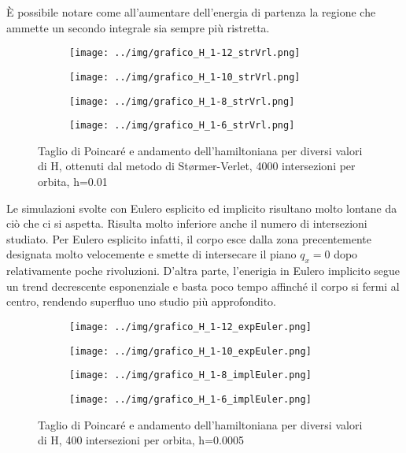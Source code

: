 \documentclass[a4paper, 12pt]{article}
\numberwithin{equation}{section}
\numberwithin{figure}{section}
\begin{document}
È possibile notare come all'aumentare dell'energia di partenza la regione che ammette un secondo
integrale sia sempre più ristretta.
\begin{figure}[h!]
	\centering
	\begin{subfigure}[t]{.49\textwidth}
		\centering
		\texttt{[image: ../img/grafico\_H\_1-12\_strVrl.png]}
	\end{subfigure}
	\begin{subfigure}[t]{.49\textwidth}
		\centering
		\texttt{[image: ../img/grafico\_H\_1-10\_strVrl.png]}
	\end{subfigure}
	\begin{subfigure}[t]{.49\textwidth}
		\centering
		\texttt{[image: ../img/grafico\_H\_1-8\_strVrl.png]}
	\end{subfigure}
	\begin{subfigure}[t]{.49\textwidth}
		\centering
		\texttt{[image: ../img/grafico\_H\_1-6\_strVrl.png]}
	\end{subfigure}

	\caption{Taglio di Poincaré e andamento dell'hamiltoniana per diversi valori di H,
	ottenuti dal metodo di Størmer-Verlet, 4000 intersezioni per orbita, h=0.01}
	\label{img:stormerverlet}
\end{figure}

Le simulazioni svolte con Eulero esplicito ed implicito risultano molto lontane da ciò che ci
si aspetta. Risulta molto inferiore anche il numero di intersezioni studiato.
Per Eulero esplicito infatti, il corpo esce dalla zona precentemente designata molto velocemente
e smette di intersecare il piano $q_x=0$ dopo relativamente poche rivoluzioni. D'altra parte,
l'enerigia in Eulero implicito segue un trend decrescente esponenziale e basta poco tempo affinché
il corpo si fermi al centro, rendendo superfluo uno studio più approfondito.
\clearpage
\begin{figure}[h!]
	\centering
	\begin{subfigure}[t]{.49\textwidth}
		\centering
		\texttt{[image: ../img/grafico\_H\_1-12\_expEuler.png]}
	\end{subfigure}
	\begin{subfigure}[t]{.49\textwidth}
		\centering
		\texttt{[image: ../img/grafico\_H\_1-10\_expEuler.png]}
	\end{subfigure}
	\begin{subfigure}[t]{.49\textwidth}
		\centering
		\texttt{[image: ../img/grafico\_H\_1-8\_implEuler.png]}
	\end{subfigure}
	\begin{subfigure}[t]{.49\textwidth}
		\centering
		\texttt{[image: ../img/grafico\_H\_1-6\_implEuler.png]}
	\end{subfigure}

	\caption{Taglio di Poincaré e andamento dell'hamiltoniana per diversi valori di H,
	400 intersezioni per orbita, h=0.0005}
\end{figure}
\end{document}
